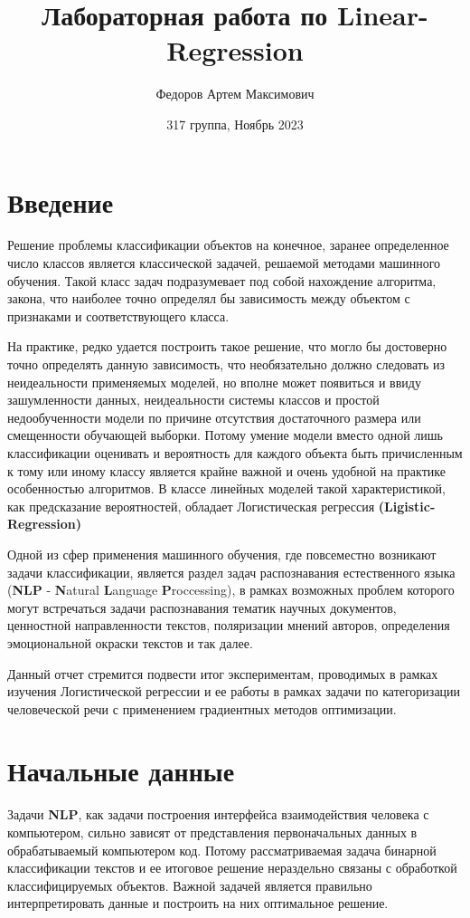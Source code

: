 \documentclass{article}
\title{Лабораторная работа по Linear-Regression}
\author{Федоров Артем Максимович}
\date{317 группа, Ноябрь 2023}
\begin{document}
\maketitle

\section{Введение}
    Решение проблемы классификации объектов на конечное, заранее определенное число классов является классической задачей, решаемой методами машинного обучения. Такой класс задач подразумевает под собой нахождение алгоритма, закона, что наиболее точно определял бы зависимость между объектом с признаками и соответствующего класса.

    На практике, редко удается построить такое решение, что могло бы достоверно точно определять данную зависимость, что необязательно должно следовать из неидеальности применяемых моделей, но вполне может появиться и ввиду зашумленности данных, неидеальности системы классов и простой недообученности модели по причине отсутствия достаточного размера или смещенности обучающей выборки. Потому умение модели вместо одной лишь классификации оценивать и вероятность для каждого объекта быть причисленным к тому или иному классу является крайне важной и очень удобной на практике особенностью алгоритмов. В классе линейных моделей такой характеристикой, как предсказание вероятностей, обладает Логистическая регрессия \textbf{(Ligistic-Regression)}

    Одной из сфер применения машинного обучения, где повсеместно возникают задачи классификации, является раздел задач распознавания естественного языка (\textbf{NLP} - \textbf{N}atural \textbf{L}anguage \textbf{P}roccessing), в рамках возможных проблем которого могут встречаться задачи распознавания тематик научных документов, ценностной направленности текстов, поляризации мнений авторов, определения эмоциональной окраски текстов и так далее.

    Данный отчет стремится подвести итог экспериментам, проводимых в рамках изучения Логистической регрессии и ее работы в рамках задачи по категоризации человеческой речи с применением градиентных методов оптимизации.

\section{Начальные данные}
    Задачи \textbf{NLP}, как задачи построения интерфейса взаимодействия человека с компьютером, сильно зависят от представления первоначальных данных в обрабатываемый компьютером код. Потому рассматриваемая задача бинарной классификации текстов и ее итоговое решение нераздельно связаны с обработкой классифицируемых объектов. Важной задачей является правильно интерпретировать данные и построить на них оптимальное решение. 
\end{document}
